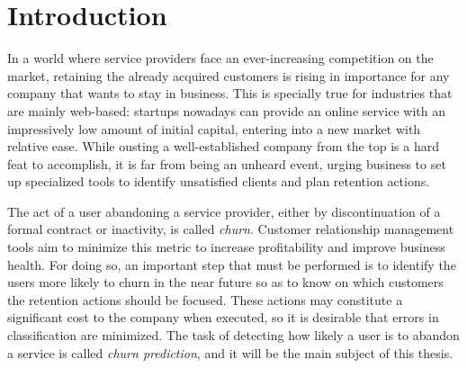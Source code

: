 \documentclass{kththesis}
\begin{document}
\clearpage

\cleardoublepage

\tableofcontents

\listoffigures
 
\listoftables


\mainmatter


\chapter{Introduction}

		In a world where service providers face an ever-increasing competition on the market, retaining the already acquired customers is rising in importance for any company that wants to stay in business. This is specially true for industries that are mainly web-based: startups nowadays can provide an online service with  an impressively low amount of initial capital, entering into a new market with relative ease. While ousting a well-established company from the top is a hard feat to accomplish, it is far from being an unheard event, urging business to set up specialized tools to identify unsatisfied clients and plan retention actions. 
		
	The act of a user abandoning a service provider, either by discontinuation of a formal contract or inactivity, is called \emph{churn}. Customer relationship management tools aim to minimize this metric to increase profitability and improve business health. For doing so, an important step that must be performed is to identify the users more likely to churn in the near future so as to know on which customers the retention actions should be focused. These actions may constitute a significant cost to the company when executed, so it is desirable that errors in classification are minimized. The task of detecting how likely a user is to abandon a service is called \emph{churn prediction}, and it will be the main subject of this thesis.
	
\end{document}
